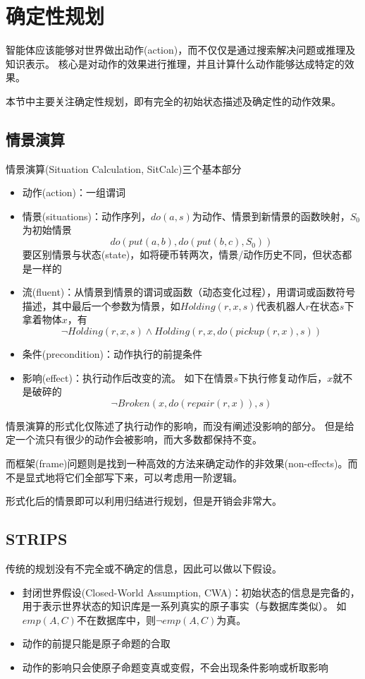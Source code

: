 
\section{确定性规划}
智能体应该能够对世界做出动作(action)，而不仅仅是通过搜索解决问题或推理及知识表示。
核心是对动作的效果进行推理，并且计算什么动作能够达成特定的效果。

本节中主要关注确定性规划，即有完全的初始状态描述及确定性的动作效果。

\subsection{情景演算}
情景演算(Situation Calculation, SitCalc)三个基本部分
\begin{itemize}
	\item 动作(action)：一组谓词
	\item 情景(situations)：动作序列，$do(a,s)$为动作、情景到新情景的函数映射，$S_0$为初始情景
	\[do(put(a,b),do(put(b,c),S_0))\]
	要区别情景与状态(state)，如将硬币转两次，情景/动作历史不同，但状态都是一样的
	\item 流(fluent)：从情景到情景的谓词或函数（动态变化过程），用谓词或函数符号描述，其中最后一个参数为情景，如$Holding(r,x,s)$代表机器人$r$在状态$s$下拿着物体$x$，有
	\[\lnot Holding(r,x,s)\land Holding(r,x,do(pickup(r,x),s))\]
	\item 条件(precondition)：动作执行的前提条件
	\item 影响(effect)：执行动作后改变的流。 %
	如下在情景$s$下执行修复动作后，$x$就不是破碎的
	\[\lnot Broken(x,do(repair(r,x)),s)\]
\end{itemize}

情景演算的形式化仅陈述了执行动作的影响，而没有阐述没影响的部分。
但是给定一个流只有很少的动作会被影响，而大多数都保持不变。

而框架(frame)问题则是找到一种高效的方法来确定动作的非效果(non-effects)。而不是显式地将它们全部写下来，可以考虑用一阶逻辑。

形式化后的情景即可以利用归结进行规划，但是开销会非常大。

\subsection{STRIPS}
传统的规划没有不完全或不确定的信息，因此可以做以下假设。
\begin{itemize}
	\item 封闭世界假设(Closed-World Assumption, CWA)：初始状态的信息是完备的，用于表示世界状态的知识库是一系列真实的原子事实（与数据库类似）。
	如$emp(A,C)$不在数据库中，则$\lnot emp(A,C)$为真。
	\item 动作的前提只能是原子命题的合取
	\item 动作的影响只会使原子命题变真或变假，不会出现条件影响或析取影响
\end{itemize}

